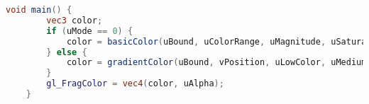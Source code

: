 
\begin{lstlisting}[language=GLSL]
	void main() {
		vec3 color;
		if (uMode == 0) {
			color = basicColor(uBound, uColorRange, uMagnitude, uSaturation, uLightness);
		} else {
			color = gradientColor(uBound, vPosition, uLowColor, uMediumColor, uHighColor);
		}
		gl_FragColor = vec4(color, uAlpha);
	}
\end{lstlisting}
